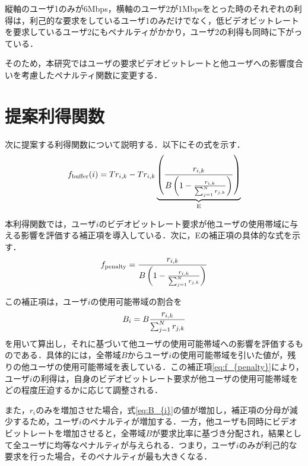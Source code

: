 縦軸のユーザ1のみが6Mbps，横軸のユーザ2が1Mbpsをとった時のそれぞれの利得は，利己的な要求をしているユーザ1のみだけでなく，低ビデオビットレートを要求しているユーザ2にもペナルティがかかり，ユーザ2の利得も同時に下がっている．

そのため，本研究ではユーザの要求ビデオビットレートと他ユーザへの影響度合いを考慮したペナルティ関数に変更する．


\section{提案利得関数}
次に提案する利得関数について説明する．以下にその式を示す．
\begin{equation}
    f_{\mathrm{buffer}}(i) = Tr_{i,k} - Tr_{i,k}\underbrace{\left(\frac{r_{i,k}}{B\left(1-\frac{r_{i,k}}{\sum^N_{j=1}r_{j,k}}\right)}\right)}_{\rm{E}}
    \label{eq:f_buffi}
\end{equation}

本利得関数では，ユーザ$i$のビデオビットレート要求が他ユーザの使用帯域に与える影響を評価する補正項を導入している．次に，Eの補正項の具体的な式を示す．
\begin{equation}
    f_{\mathrm{penalty}}=\frac{r_{i,k}}{B\left(1-\frac{r_{i,k}}{\sum^N_{j=1}r_{j,k}}\right)}
    \label{eq:f_{penalty}}
\end{equation}

この補正項は，ユーザ$i$の使用可能帯域の割合を
\begin{equation}
    B_{i}=B\frac{r_{i,k}}{\sum^N_{j=1}r_{j,k}}
    \label{eq:B_{i}}
\end{equation}
を用いて算出し，それに基づいて他ユーザの使用可能帯域への影響を評価するものである\cite{johari}．具体的には，全帯域$B$からユーザ$i$の使用可能帯域を引いた値が，残りの他ユーザの使用可能帯域を表している．この補正項\ref{eq:f_{penalty}}により，ユーザ$i$の利得は，自身のビデオビットレート要求が他ユーザの使用可能帯域をどの程度圧迫するかに応じて調整される．

また，$r_i$のみを増加させた場合，式\ref{eq:B_{i}}の値が増加し，補正項の分母が減少するため，ユーザ$i$のペナルティが増加する．一方，他ユーザも同時にビデオビットレートを増加させると，全帯域$B$が要求比率に基づき分配され，結果として全ユーザに均等なペナルティが与えられる．つまり，ユーザ$i$のみが利己的な要求を行った場合，そのペナルティが最も大きくなる．